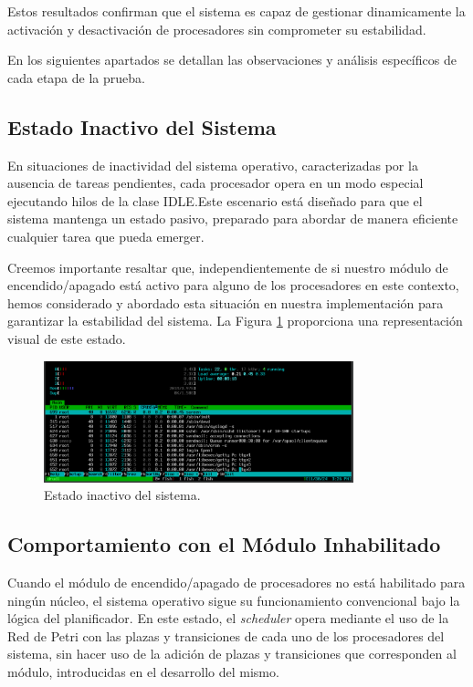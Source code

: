Estos resultados confirman que el sistema es capaz de gestionar dinamicamente la activación y desactivación de procesadores sin comprometer su estabilidad.\par

En los siguientes apartados se detallan las observaciones y análisis específicos de cada etapa de la prueba.\par

\subsection{Estado Inactivo del Sistema}
En situaciones de inactividad del sistema operativo, caracterizadas por la ausencia de tareas pendientes, cada procesador opera en un modo especial ejecutando hilos de la clase IDLE.\@ Este escenario está diseñado para que el sistema mantenga un estado pasivo, preparado para abordar de manera eficiente cualquier tarea que pueda emerger.\par

Creemos importante resaltar que, independientemente de si nuestro módulo de encendido/apagado está activo para alguno de los procesadores en este contexto, hemos considerado y abordado esta situación en nuestra implementación para garantizar la estabilidad del sistema. La Figura \ref{fig:cpuOnOff-result-idle} proporciona una representación visual de este estado.\par

\begin{figure}[H]
    \centering
    \includegraphics[width=0.8\textwidth]{images/cpuOnOff-result-idle.png}
    \caption{Estado inactivo del sistema.}
    \label{fig:cpuOnOff-result-idle}
\end{figure}

\subsection{Comportamiento con el Módulo Inhabilitado}
Cuando el módulo de encendido/apagado de procesadores no está habilitado para ningún núcleo, el sistema operativo sigue su funcionamiento convencional bajo la lógica del planificador. En este estado, el \textit{scheduler} opera mediante el uso de la Red de Petri  con las plazas y transiciones de cada uno de los procesadores del sistema, sin hacer uso de la adición de plazas y transiciones que corresponden al módulo, introducidas en el desarrollo del mismo.\par

